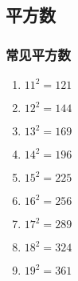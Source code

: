 \subsection{平方数}

\subsubsection{常见平方数}

\begin{multicols}{2}
	\begin{enumerate}
		\item $11^2 = 121$
		\item $12^2 = 144$
		\item $13^2 = 169$
		\item $14^2 = 196$
		\item $15^2 = 225$
		\item $16^2 = 256$
		\item $17^2 = 289$
		\item $18^2 = 324$
		\item $19^2 = 361$
	\end{enumerate}
\end{multicols}